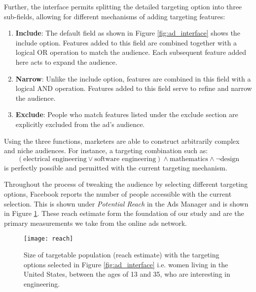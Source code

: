 Further, the interface permits splitting the detailed targeting option into three sub-fields, allowing for different mechanisms of adding targeting features:

\begin{enumerate}
\item \textbf{Include}: The default field as shown in Figure \ref{fig:ad_interface} shows the include option. Features added to this field are combined together with a logical OR operation to match the audience. Each subsequent feature added here acts to expand the audience.

\item \textbf{Narrow}: Unlike the include option, features are combined in this field with a logical AND operation. Features added to this field serve to refine and narrow the audience.

\item \textbf{Exclude}: People who match features listed under the exclude section are explicitly excluded from the ad's audience.
\end{enumerate}

Using the three functions, marketers are able to construct arbitrarily complex and niche audiences. For instance, a targeting combination such as:
$$(\text{electrical engineering} \lor \text{software engineering}) \land \text{mathematics} \land \neg \text{design}$$
is perfectly possible and permitted with the current targeting mechanism.

Throughout the process of tweaking the audience by selecting different targeting options, Facebook reports the number of people accessible with the current selection. This is shown under \textit{Potential Reach} in the Ads Manager and is shown in Figure \ref{fig:reach}. These reach estimate form the foundation of our study and are the primary measurements we take from the online ads network.

\begin{figure}

\centering
\texttt{[image: reach]}
\caption{Size of targetable population (reach estimate) with the targeting options selected in Figure \ref{fig:ad_interface} i.e. women living in the United States, between the ages of 13 and 35, who are interesting in engineering.}
\label{fig:reach}

\end{figure}

